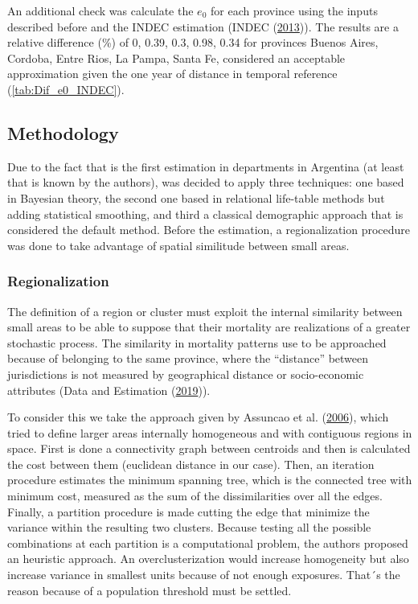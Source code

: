 \documentclass[12pt,]{article}
\begin{document}
An additional check was calculate the \(e_0\) for each province using
the inputs described before and the INDEC estimation (INDEC
(\protect\hyperlink{ref-INDEC2013}{2013})). The results are a relative
difference (\%) of 0, 0.39, 0.3, 0.98, 0.34 for provinces Buenos Aires,
Cordoba, Entre Rios, La Pampa, Santa Fe, considered an acceptable
approximation given the one year of distance in temporal reference
(\ref{tab:Dif_e0_INDEC}).

\hypertarget{methodology}{%
\subsection{\texorpdfstring{\textbf{Methodology}}{Methodology}}\label{methodology}}

Due to the fact that is the first estimation in departments in Argentina
(at least that is known by the authors), was decided to apply three
techniques: one based in Bayesian theory, the second one based in
relational life-table methods but adding statistical smoothing, and
third a classical demographic approach that is considered the default
method. Before the estimation, a regionalization procedure was done to
take advantage of spatial similitude between small areas.

\hypertarget{regionalization}{%
\subsubsection{\texorpdfstring{\textbf{Regionalization}}{Regionalization}}\label{regionalization}}

The definition of a region or cluster must exploit the internal
similarity between small areas to be able to suppose that their
mortality are realizations of a greater stochastic process. The
similarity in mortality patterns use to be approached because of
belonging to the same province, where the ``distance'' between
jurisdictions is not measured by geographical distance or socio-economic
attributes (Data and Estimation
(\protect\hyperlink{ref-Longford2005}{2019})).

To consider this we take the approach given by Assuncao et al.
(\protect\hyperlink{ref-AssunCao2006}{2006}), which tried to define
larger areas internally homogeneous and with contiguous regions in
space. First is done a connectivity graph between centroids and then is
calculated the cost between them (euclidean distance in our case). Then,
an iteration procedure estimates the minimum spanning tree, which is the
connected tree with minimum cost, measured as the sum of the
dissimilarities over all the edges. Finally, a partition procedure is
made cutting the edge that minimize the variance within the resulting
two clusters. Because testing all the possible combinations at each
partition is a computational problem, the authors proposed an heuristic
approach. An overclusterization would increase homogeneity but also
increase variance in smallest units because of not enough exposures.
That´s the reason because of a population threshold must be settled.
\end{document}
